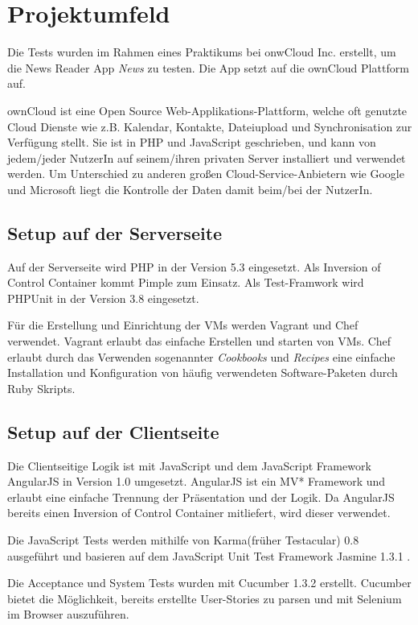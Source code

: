 \documentclass[a4paper,bibtotoc,oneside]{scrbook}
\begin{document}
\chapter{Projektumfeld}
Die Tests wurden im Rahmen eines Praktikums bei onwCloud Inc. erstellt, um die News Reader App \emph{News} zu testen. Die App setzt auf die ownCloud\cite{owncloud} Plattform auf.

ownCloud ist eine Open Source Web-Applikations-Plattform, welche oft genutzte Cloud Dienste wie z.B. Kalendar, Kontakte, Dateiupload und Synchronisation zur Verfügung stellt. Sie ist in PHP und JavaScript geschrieben, und kann von jedem/jeder NutzerIn auf seinem/ihren privaten Server installiert und verwendet werden. Um Unterschied zu anderen großen Cloud-Service-Anbietern wie Google und Microsoft liegt die Kontrolle der Daten damit beim/bei der NutzerIn. 

\section{Setup auf der Serverseite}
Auf der Serverseite wird PHP in der Version 5.3 eingesetzt. Als Inversion of Control Container kommt Pimple\cite{pimple} zum Einsatz. Als Test-Framwork wird PHPUnit\cite{phpunit} in der Version 3.8 eingesetzt.

Für die Erstellung und Einrichtung der VMs werden Vagrant\cite{vagrant} und Chef\cite{chef} verwendet. Vagrant erlaubt das einfache Erstellen und starten von VMs. Chef erlaubt durch das Verwenden sogenannter \emph{Cookbooks} und \emph{Recipes} eine einfache Installation und Konfiguration von häufig verwendeten Software-Paketen durch Ruby Skripts.

\section{Setup auf der Clientseite}
Die Clientseitige Logik ist mit JavaScript und dem JavaScript Framework AngularJS\cite{angular} in Version 1.0 umgesetzt. AngularJS ist ein MV* Framework und erlaubt eine einfache Trennung der Präsentation und der Logik. Da AngularJS bereits einen Inversion of Control Container mitliefert, wird dieser verwendet. 

Die JavaScript Tests werden mithilfe von Karma\cite{karma}(früher Testacular) 0.8 ausgeführt und basieren auf dem JavaScript Unit Test Framework Jasmine 1.3.1 \cite{jasmine}. 

Die Acceptance und System Tests wurden mit Cucumber 1.3.2 \cite{cucumber} erstellt. Cucumber bietet die Möglichkeit, bereits erstellte User-Stories zu parsen und mit Selenium im Browser auszuführen.
\end{document}
